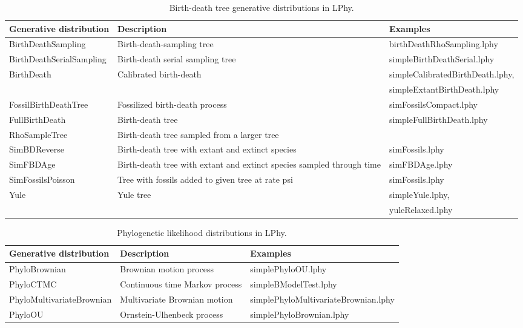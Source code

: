 \documentclass[12pt]{article} %
\begin{document}
\begin{table}
\small
\begin{tabular}{ p{4.6cm} | p{6.5cm} | p{5cm} }
    \hline\hline
    Generative distribution & Description & Examples \\ 
    \hline\hline
    BirthDeathSampling & Birth-death-sampling tree\cite{stadler2011mammalian,stadler2012estimatingdata} & birthDeathRhoSampling.lphy\\  
    BirthDeathSerialSampling & Birth-death serial sampling tree\cite{stadler2013dating} & simpleBirthDeathSerial.lphy\\  
    BirthDeath & Calibrated birth-death\cite{heled2015calibrated} & simpleCalibratedBirthDeath.lphy, \\ & & simpleExtantBirthDeath.lphy\\  
    FossilBirthDeathTree & Fossilized birth-death process\cite{heath2014fossilized} & simFossilsCompact.lphy\\  
    FullBirthDeath & Birth-death tree\cite{kendall1948generalized} & simpleFullBirthDeath.lphy\\  
    RhoSampleTree & Birth-death tree sampled from a larger tree & \\  
    SimBDReverse & Birth-death tree with extant and extinct species & simFossils.lphy\\  
    SimFBDAge & Birth-death tree with extant and extinct species sampled through time & simFBDAge.lphy \\   
    SimFossilsPoisson & Tree with fossils added to given tree at rate psi & simFossils.lphy\\  
    Yule & Yule tree\cite{yule1925ii} & simpleYule.lphy, \\ 
    & & yuleRelaxed.lphy\\  
    \hline
\end{tabular}
\label{tab:coalescent}
\caption{Birth-death tree generative distributions in LPhy.}
\end{table}

\begin{table}
\small
\begin{center}
\begin{tabular}{ l | l | l }
    \hline\hline
    Generative distribution & Description & Examples \\ 
    \hline\hline
    PhyloBrownian & Brownian motion process\cite{felsenstein1973maximum} & simplePhyloOU.lphy\\  
    PhyloCTMC & Continuous time Markov process\cite{felsenstein1981} & simpleBModelTest.lphy\\  
    PhyloMultivariateBrownian & Multivariate Brownian motion & simplePhyloMultivariateBrownian.lphy\\  
    PhyloOU & Ornstein-Ulhenbeck process\cite{felsenstein1973maximum} & simplePhyloBrownian.lphy\\  
    \hline
\end{tabular}
\end{center}
\label{tab:coalescent}
\caption{Phylogenetic likelihood distributions in LPhy.}
\end{table}
\end{document}
